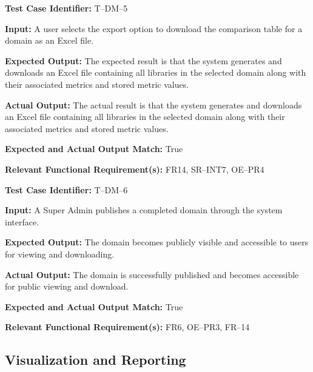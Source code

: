 \documentclass[12pt, titlepage]{article}
\begin{document}
\begin{mdframed}[linewidth=0.5mm]
\setlength{\parindent}{0pt}
\textbf{Test Case Identifier:} T--DM--5
\vspace{0.4em}

\textbf{Input:} A user selects the export option to download the comparison table for a domain as an Excel file.
\vspace{0.4em}

\textbf{Expected Output:} The expected result is that the system generates and downloads an Excel file containing all libraries in the selected domain along with their associated metrics and stored metric values.
\vspace{0.4em}

\textbf{Actual Output:} The actual result is that the system generates and downloads an Excel file containing all libraries in the selected domain along with their associated metrics and stored metric values.
\vspace{0.4em}

\textbf{Expected and Actual Output Match:} True
\vspace{0.4em}

\textbf{Relevant Functional Requirement(s):} FR14, SR--INT7, OE--PR4
\end{mdframed}
\begin{mdframed}[linewidth=0.5mm]
\setlength{\parindent}{0pt}
\textbf{Test Case Identifier:} T--DM--6
\vspace{0.4em}

\textbf{Input:} A Super Admin publishes a completed domain through the system interface.
\vspace{0.4em}

\textbf{Expected Output:} The domain becomes publicly visible and accessible to users for viewing and downloading.
\vspace{0.4em}

\textbf{Actual Output:} The domain is successfully published and becomes accessible for public viewing and download.
\vspace{0.4em}

\textbf{Expected and Actual Output Match:} True
\vspace{0.4em}

\textbf{Relevant Functional Requirement(s):} FR6, OE--PR3, FR--14
\end{mdframed}
\subsection{Visualization and Reporting}
\end{document}
